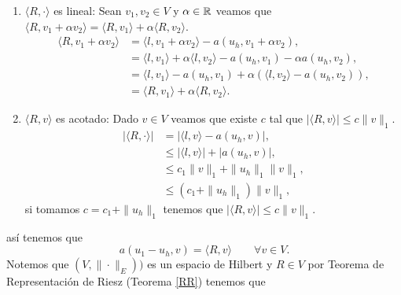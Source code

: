 \begin{enumerate}[{\rm (i)}]
\item $\langle R,\cdot \rangle$ es lineal: Sean $v_{1},v_{2}\in V$ y $\alpha\in {\ensuremath{\mathbb{R}}}$ veamos que $\langle R,v_{1} + \alpha v_{2} \rangle = \langle R,v_{1} \rangle + \alpha\langle R,v_{2} \rangle$.
\begin{equation*}
\begin{split}
\langle R,v_{1} + \alpha v_{2} \rangle &= \langle l,v_{1} + \alpha v_{2} \rangle - a(u_{h},v_{1}+ \alpha v_{2}), \\
&=\langle l,v_{1} \rangle + \alpha \langle l,v_{2} \rangle - a(u_{h},v_{1}) - \alpha a(u_{h},v_{2}), \\
&=\langle l,v_{1} \rangle - a(u_{h},v_{1}) + \alpha (\langle l,v_{2} \rangle - a(u_{h},v_{2}) ),\\
&=\langle R,v_{1} \rangle + \alpha \langle R,v_{2} \rangle .
\end{split}
\end{equation*}		
\item $\langle R,v\rangle$ es acotado: Dado $v\in V$ veamos que existe $c$ tal que $|\langle R,v \rangle|\leq  c \|v\|_{1}$. 
\begin{equation*}
\begin{split}
|\langle R,\cdot \rangle| &= |\langle l,v \rangle - a(u_{h},v) |,\\
&\leq |\langle l,v \rangle| + |a(u_{h},v)|,\\
&\leq c_{1}\|v\|_{1} + \| u_{h} \|_{1}\|v\|_{1},\\
&\leq (c_{1}+\|u_{h} \|_{1}) \|v\|_{1},
\end{split}
\end{equation*}
si tomamos $c=c_{1}+\|u_{h}\|_{1}$ tenemos que $ |\langle R,v \rangle| \leq c \|v\|_{1}$.
\end{enumerate}
as\'i tenemos que 
\begin{equation}\label{residual02}
a(u_{1}-u_{h},v)=\langle R,v \rangle \qquad \forall v\in V.
\end{equation}
Notemos que $(V,\|\cdot\|_{E}))$ es un espacio de Hilbert y $R\in V$ por Teorema de Representaci\'on de Riesz (Teorema \eqref{RR}) tenemos que 

